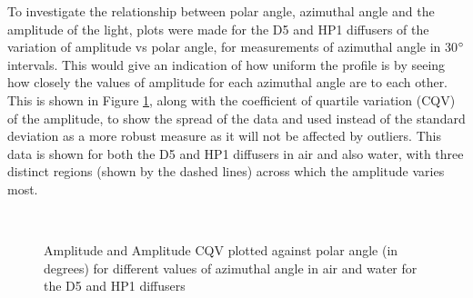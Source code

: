 To investigate the relationship between polar angle, azimuthal angle and the amplitude of the light, plots were made for the D5 and HP1 diffusers of the variation of amplitude vs polar angle, for measurements of azimuthal angle in 30$\degree$ intervals. This would give an indication of how uniform the profile is by seeing how closely the values of amplitude for each azimuthal angle are to each other. This is shown in Figure \ref{fig:HP1_D5_azimuthal}, along with the coefficient of quartile variation (CQV) of the amplitude, to show the spread of the data and used instead of the standard deviation as a more robust measure as it will not be affected by outliers.  This data is shown for both the D5 and HP1 diffusers in air and also water, with three distinct regions (shown by the dashed lines) across which the amplitude varies most. 

\begin{figure}[!htbp]
    \centering
    
    \caption{Amplitude and Amplitude CQV plotted against polar angle (in degrees) for different values of azimuthal angle in air and water for the D5 and HP1 diffusers}\label{fig:HP1_D5_azimuthal}
    
    \\
    
\end{figure}

